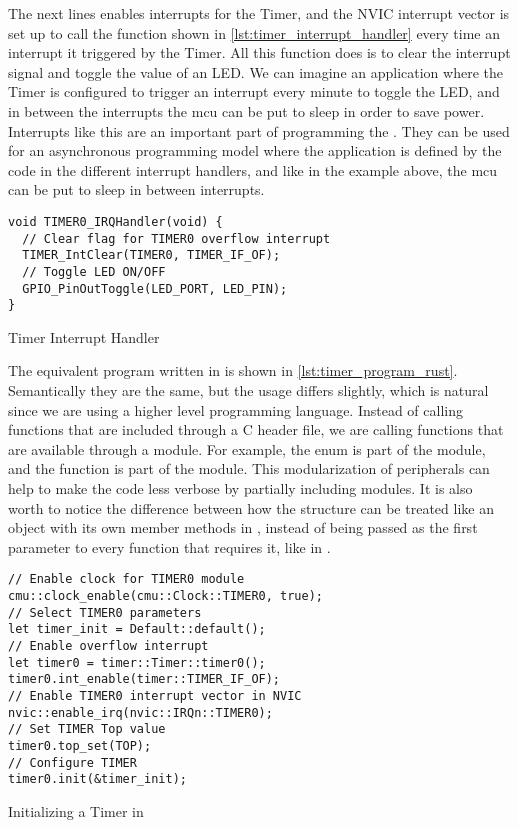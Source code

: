 The next lines enables interrupts for the Timer, and the NVIC interrupt vector is set up to call the function shown in \autoref{lst:timer_interrupt_handler} every time an interrupt it triggered by the Timer.
All this function does is to clear the interrupt signal and toggle the value of an LED.
We can imagine an application where the Timer is configured to trigger an interrupt every minute to toggle the LED, and in between the interrupts the \gls{mcu} can be put to sleep in order to save power.
Interrupts like this are an important part of programming the \gecko.
They can be used for an asynchronous programming model where the application is defined by the code in the different interrupt handlers, and like in the example above, the \gls{mcu} can be put to sleep in between interrupts.

\begin{listing}[h]
\begin{verbatim}
void TIMER0_IRQHandler(void) {
  // Clear flag for TIMER0 overflow interrupt
  TIMER_IntClear(TIMER0, TIMER_IF_OF);
  // Toggle LED ON/OFF
  GPIO_PinOutToggle(LED_PORT, LED_PIN);
}
\end{verbatim}
\caption{Timer Interrupt Handler}
\label{lst:timer_interrupt_handler}
\end{listing}

The equivalent program written in {\rust} is shown in \autoref{lst:timer_program_rust}.
Semantically they are the same, but the usage differs slightly, which is natural since we are using a higher level programming language.
Instead of calling functions that are included through a C header file, we are calling functions that are available through a {\rust} module.
For example, the  enum is part of the  module, and the  function is part of the  module.
This modularization of peripherals can help to make the code less verbose by partially including modules.
It is also worth to notice the difference between how the  structure can be treated like an object with its own member methods in {\rust}, instead of being passed as the first parameter to every function that requires it, like in \C.

\begin{listing}[h]
\begin{verbatim}
// Enable clock for TIMER0 module
cmu::clock_enable(cmu::Clock::TIMER0, true);
// Select TIMER0 parameters
let timer_init = Default::default();
// Enable overflow interrupt
let timer0 = timer::Timer::timer0();
timer0.int_enable(timer::TIMER_IF_OF);
// Enable TIMER0 interrupt vector in NVIC
nvic::enable_irq(nvic::IRQn::TIMER0);
// Set TIMER Top value
timer0.top_set(TOP);
// Configure TIMER
timer0.init(&timer_init);
\end{verbatim}
\caption{Initializing a Timer in {\rust}}
\label{lst:timer_program_rust}
\end{listing}

